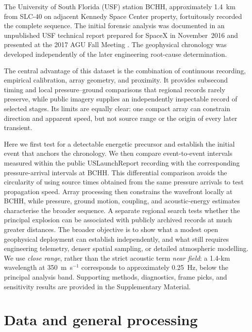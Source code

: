 \documentclass[]{seismica}
\begin{document}
The University of South Florida (USF) station BCHH, approximately 1.4~km from
SLC-40 on adjacent Kennedy Space Center property, fortuitously recorded the
complete sequence. The initial forensic analysis was documented in an
unpublished USF technical report prepared for SpaceX in November~2016
\citep{thompson_mcnutt_fireball_2016} and presented at the 2017 AGU Fall
Meeting \citep{thompson_agu_falcon9_2017}. The geophysical chronology was
developed independently of the later engineering root-cause determination.

The central advantage of this dataset is the combination of continuous
recording, empirical calibration, array geometry, and proximity. It provides
subsecond timing and local pressure--ground comparisons that regional records
rarely preserve, while public imagery supplies an independently inspectable
record of selected stages. Its limits are equally clear: one compact array can
constrain direction and apparent speed, but not source range or the origin of
every later transient.

Here we first test for a detectable energetic precursor and establish the
initial event that anchors the chronology. We then compare event-to-event
intervals measured within the public USLaunchReport recording with the corresponding
pressure-arrival intervals at BCHH. This differential comparison avoids the
circularity of using source times obtained from the same pressure arrivals to
test propagation speed. Array processing then constrains the wavefront locally
at BCHH, while pressure, ground motion, coupling, and acoustic-energy estimates
characterise the broader sequence. A separate regional search tests whether the
principal explosion can be associated with publicly archived records at much
greater distances. The broader objective is to show what a modest open
geophysical deployment can establish independently, and what still requires
engineering telemetry, denser spatial sampling, or detailed atmospheric
modelling. We use \emph{close range}, rather than the strict acoustic term
\emph{near field}: a 1.4-km wavelength at 350~m~s$^{-1}$ corresponds to
approximately 0.25~Hz, below the principal analysis band. Supporting methods,
diagnostics, frame picks, and sensitivity results are provided in the
Supplementary Material.


\section{Data and general processing}
\label{sec:data}
\end{document}

